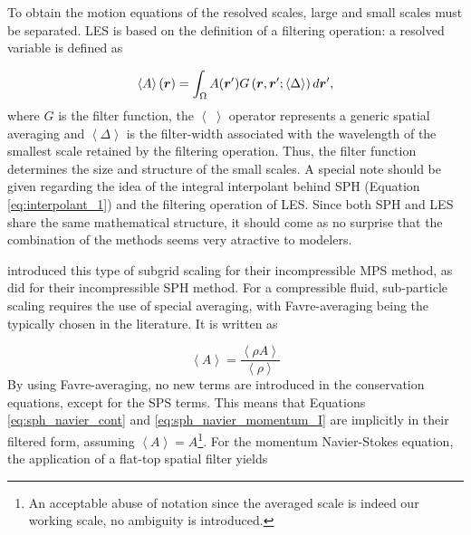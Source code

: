 To obtain the motion equations of the resolved scales, large and small scales must be separated. \ac{LES} is based on the definition of a filtering operation: a resolved variable is defined as

%
\begin{equation} \label{eq:eq_les_filter}
	\left\langle A \right\rangle(\boldsymbol{r})=\int_\Omega{A(\boldsymbol{r}')G\left( {{\boldsymbol{r}}, {\boldsymbol{r}}';\left\langle \Delta \right\rangle} \right)d{\boldsymbol{r}}'}  , 
\end{equation}
%
where $G$ is the filter function, the $\left\langle \; \right\rangle$ operator represents a generic spatial averaging and $\left\langle \Delta \right\rangle$ is the filter-width associated with the wavelength of the smallest scale retained by the filtering operation. Thus, the filter function determines the size and structure of the small scales. A special note should be given regarding the idea of the integral interpolant behind \ac{SPH} (Equation \eqref{eq:interpolant_1}) and the filtering operation of \ac{LES}. Since both \ac{SPH} and \ac{LES} share the same mathematical structure, it should come as no surprise that the combination of the methods seems very atractive to modelers.

\cite{Gotoh-2001} introduced this type of subgrid scaling for their incompressible \ac{MPS} method, as did \cite{Lo-2002} for their incompressible SPH method. For a compressible fluid, sub-particle scaling requires the use of special averaging, with Favre-averaging being the typically chosen in the literature. It is written as

%
\begin{equation} \label{eq:favre-average}
	\left\langle A \right\rangle=\frac{\left\langle\rho A\right\rangle}{\left\langle\rho\right\rangle}
\end{equation}
%
By using Favre-averaging, no new terms are introduced in the conservation equations, except for the \ac{SPS} terms. This means that Equations \eqref{eq:sph_navier_cont} and \eqref{eq:sph_navier_momentum_I} are implicitly in their filtered form, assuming $\left\langle A \right\rangle=A$\footnote{An acceptable abuse of notation since the averaged scale is indeed our working scale, no ambiguity is introduced.}. For the momentum Navier-Stokes equation, the application of a flat-top spatial filter yields \citep{Yoshizawa-1986} 

